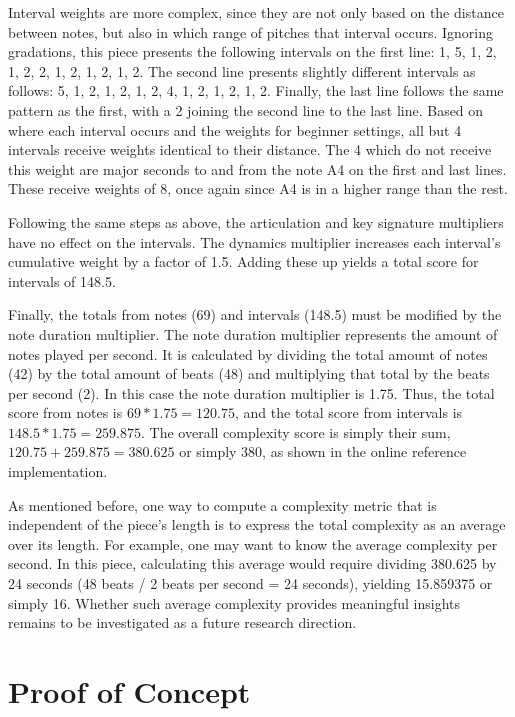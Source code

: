 \documentclass[10pt,preprint]{sigplanconf}
\begin{document}
Interval weights are more complex, since they are not only based on the distance between notes, but also in which range of pitches that interval occurs. Ignoring gradations, this piece presents the following intervals on the first line: 1, 5, 1, 2, 1, 2, 2, 1, 2, 1, 2, 1, 2. The second line presents slightly different intervals as follows: 5, 1, 2, 1, 2, 1, 2, 4, 1, 2, 1, 2, 1, 2. Finally, the last line follows the same pattern as the first, with a 2 joining the second line to the last line. Based on where each interval occurs and the weights for beginner settings, all but 4 intervals receive weights identical to their distance. The 4 which do not receive this weight are major seconds to and from the note A4 on the first and last lines. These receive weights of 8, once again since A4 is in a higher range than the rest.

Following the same steps as above, the articulation and key signature multipliers have no effect on the intervals. The dynamics multiplier increases each interval's cumulative weight by a factor of 1.5. Adding these up yields a total score for intervals of 148.5.

Finally, the totals from notes (69) and intervals (148.5) must be modified by the note duration multiplier. The note duration multiplier represents the amount of notes played per second. It is calculated by dividing the total amount of notes (42) by the total amount of beats (48) and multiplying that total by the beats per second (2). In this case the note duration multiplier is 1.75. Thus, the total score from notes is $69 * 1.75 = 120.75$, and the total score from intervals is $148.5 * 1.75 = 259.875$. The overall complexity score is simply their sum, $120.75 + 259.875 = 380.625$ or simply 380, as shown in the online reference implementation.

As mentioned before, one way to compute a complexity metric that is independent of the piece's length is to express the total complexity as an average over its length. For example, one may want to know the average complexity per second. In this piece, calculating this average would require dividing 380.625 by 24 seconds (48 beats / 2 beats per second = 24 seconds), yielding 15.859375 or simply 16. Whether such average complexity provides meaningful insights remains to be investigated as a future research direction.

\section{Proof of Concept} 
\label{sec:proof}
\end{document}

